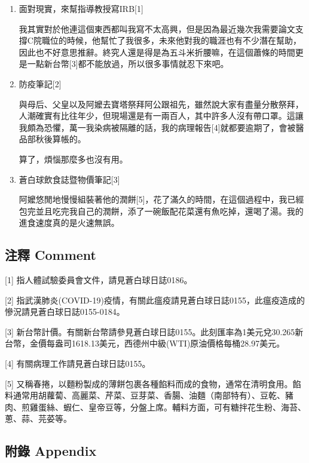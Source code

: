 \documentclass[a5paper, 11pt
]{book}
\begin{document}
\begin{enumerate}
\def\labelenumi{\arabic{enumi}.}
\item
  面對現實，來幫指導教授寫IRB{[}1{]}

  我其實對於他連這個東西都叫我寫不太高興，但是因為最近幾次我需要論文支撐C院職位的時候，他幫忙了我很多，未來他對我的職涯也有不少潛在幫助，因此也不好意思推辭。終究人還是得是為五斗米折腰嘛，在這個蕭條的時間更是一點新台幣{[}3{]}都不能放過，所以很多事情就忍下來吧。
\item
  防疫筆記{[}2{]}

  與母后、父皇以及阿嬤去寶塔祭拜阿公跟祖先，雖然說大家有盡量分散祭拜，人潮確實有比往年少，但現場還是有一兩百人，其中許多人沒有帶口罩。這讓我頗為恐懼，萬一我染病被隔離的話，我的病理報告{[}4{]}就都要逾期了，會被醫品部秋後算帳的。

  算了，煩惱那麼多也沒有用。
\item
  蒼白球飲食誌暨物價筆記{[}3{]}

  阿嬤悠閒地慢慢組裝著他的潤餅{[}5{]}，花了滿久的時間，在這個過程中，我已經包完並且吃完我自己的潤餅，添了一碗飯配花菜還有魚吃掉，還喝了湯。我的進食速度真的是火速無誤。
\end{enumerate}

\hypertarget{ux6ce8ux91cb-comment-34}{%
\subsection{注釋 Comment}\label{ux6ce8ux91cb-comment-34}}

{[}1{]} 指人體試驗委員會文件，請見蒼白球日誌0186。

{[}2{]}
指武漢肺炎(COVID-19)疫情，有關此瘟疫請見蒼白球日誌0155，此瘟疫造成的慘況請見蒼白球日誌0155-0184。

{[}3{]}
新台幣計價。有關新台幣請參見蒼白球日誌0155。此刻匯率為1美元兌30.265新台幣，金價每盎司1618.13美元，西德州中級(WTI)原油價格每桶28.97美元。

{[}4{]} 有關病理工作請見蒼白球日誌0155。

{[}5{]}
又稱春捲，以麵粉製成的薄餅包裹各種餡料而成的食物，通常在清明食用。餡料通常用胡蘿蔔、高麗菜、芹菜、豆芽菜、香腸、油麵（南部特有）、豆乾、豬肉、煎雞蛋絲、蝦仁、皇帝豆等，分盤上席。輔料方面，可有糖拌花生粉、海苔、蔥、蒜、芫荽等。

\hypertarget{ux9644ux9304-appendix-34}{%
\subsection{附錄 Appendix}\label{ux9644ux9304-appendix-34}}
\end{document}

